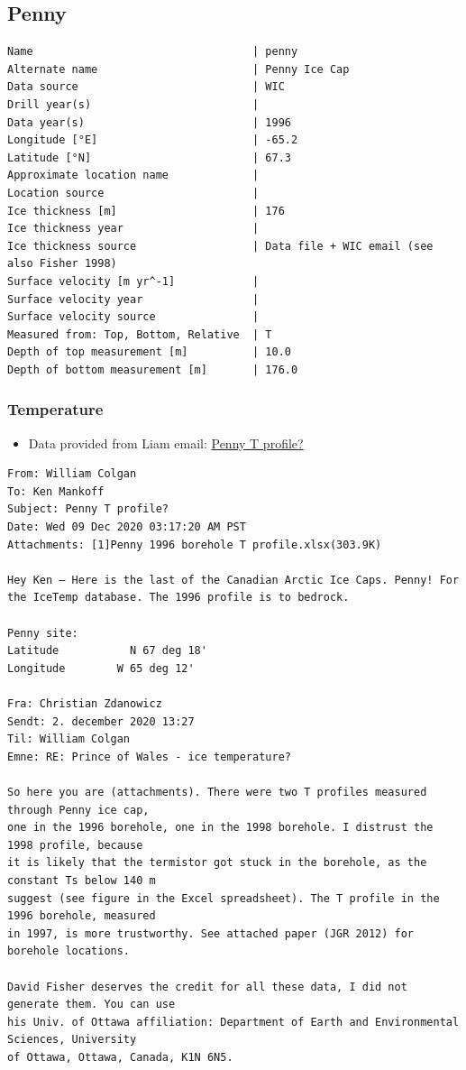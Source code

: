 \documentclass[article,a4paper,times,11pt,twoside]{article}
\begin{document}
\subsection{Penny}
\label{sec:org944cfaf}
\begin{verbatim}
Name                                  | penny
Alternate name                        | Penny Ice Cap
Data source                           | WIC
Drill year(s)                         | 
Data year(s)                          | 1996
Longitude [°E]                        | -65.2
Latitude [°N]                         | 67.3
Approximate location name             | 
Location source                       | 
Ice thickness [m]                     | 176
Ice thickness year                    | 
Ice thickness source                  | Data file + WIC email (see also Fisher 1998)
Surface velocity [m yr^-1]            | 
Surface velocity year                 | 
Surface velocity source               | 
Measured from: Top, Bottom, Relative  | T
Depth of top measurement [m]          | 10.0
Depth of bottom measurement [m]       | 176.0
\end{verbatim}

\subsubsection{Temperature}
\label{sec:org20cb956}

\begin{itemize}
\item Data provided from Liam email: \href{msgid:AM0PR04MB6129F2DC55EE1ACDB5107ED5A2CC0@AM0PR04MB6129.eurprd04.prod.outlook.com}{Penny T profile?}
\end{itemize}

\begin{verbatim}
From: William Colgan
To: Ken Mankoff
Subject: Penny T profile?
Date: Wed 09 Dec 2020 03:17:20 AM PST
Attachments: [1]Penny 1996 borehole T profile.xlsx(303.9K)

Hey Ken – Here is the last of the Canadian Arctic Ice Caps. Penny! For the IceTemp database. The 1996 profile is to bedrock.

Penny site:
Latitude           N 67 deg 18'
Longitude        W 65 deg 12'

Fra: Christian Zdanowicz
Sendt: 2. december 2020 13:27
Til: William Colgan
Emne: RE: Prince of Wales - ice temperature?

So here you are (attachments). There were two T profiles measured through Penny ice cap,
one in the 1996 borehole, one in the 1998 borehole. I distrust the 1998 profile, because
it is likely that the termistor got stuck in the borehole, as the constant Ts below 140 m
suggest (see figure in the Excel spreadsheet). The T profile in the 1996 borehole, measured
in 1997, is more trustworthy. See attached paper (JGR 2012) for borehole locations.

David Fisher deserves the credit for all these data, I did not generate them. You can use
his Univ. of Ottawa affiliation: Department of Earth and Environmental Sciences, University
of Ottawa, Ottawa, Canada, K1N 6N5.
\end{verbatim}
\end{document}

